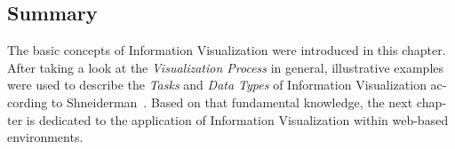 \begin{english}
\section{Summary}

The basic concepts of Information Visualization were introduced in this chapter. After taking a look at the \emph{Visualization Process} in general, illustrative examples were used to describe the \emph{Tasks} and \emph{Data Types} of Information Visualization according to Shneiderman~\cite{shneiderman96eyes}. Based on that fundamental knowledge, the next chapter is dedicated to the application of Information Visualization within web-based environments.

\end{english}